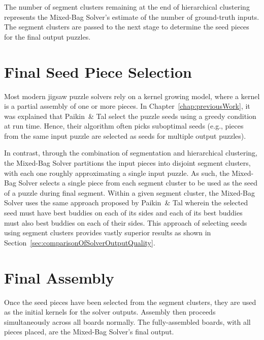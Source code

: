 The number of segment clusters remaining at the end of hierarchical clustering represents the Mixed-Bag Solver's estimate of the number of ground-truth inputs.  The segment clusters are passed to the next stage to determine the seed pieces for the final output puzzles.

\section{Final Seed Piece Selection}\label{sec:finalSeedPiece}

Most modern jigsaw puzzle solvers \cite{pomeranz2011, sholomon2013, paikin2015} rely on a kernel growing model, where a kernel is a partial assembly of one or more pieces. In Chapter~\ref{chap:previousWork}, it was explained that Paikin~\& Tal select the puzzle seeds using a greedy condition at run time. Hence, their algorithm often picks suboptimal seeds (e.g., pieces from the same input puzzle are selected as seeds for multiple output puzzles). 

In contrast, through the combination of segmentation and hierarchical clustering, the Mixed-Bag Solver partitions the input pieces into disjoint segment clusters, with each one roughly approximating a single input puzzle.  As such, the Mixed-Bag Solver selects a single piece from each segment cluster to be used as the seed of a puzzle during final segment.  Within a given segment cluster, the Mixed-Bag Solver uses the same approach proposed by Paikin~\& Tal wherein the selected seed must have best buddies on each of its sides and each of its best buddies must also best buddies on each of their sides.  This approach of selecting seeds using segment clusters provides vastly superior results as shown in Section~\ref{sec:comparisonOfSolverOutputQuality}.

\section{Final Assembly}

Once the seed pieces have been selected from the segment clusters, they are used as the initial kernels for the solver outputs.  Assembly then proceeds simultaneously across all boards normally.  The fully-assembled boards, with all pieces placed, are the Mixed-Bag Solver's final output.